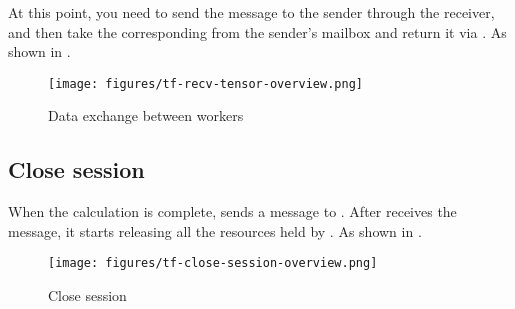 \begin{content}
At this point, you need to send the  message to the sender through the receiver, and then take the corresponding  from the sender's mailbox and return it via . As shown in .

\begin{figure}[!h]
  \centering
  \texttt{[image: figures/tf-recv-tensor-overview.png]}
  \caption{Data exchange between workers}
  \label{fig:tf-recv-tensor-overview}
\end{figure}


\subsection{Close session}
When the calculation is complete,  sends a  message to . After  receives the message, it starts releasing all the resources held by . As shown in .

\begin{figure}[!h]
  \centering
  \texttt{[image: figures/tf-close-session-overview.png]}
  \caption{Close session}
  \label{fig:tf-close-session-overview}
\end{figure}

\end{content}
